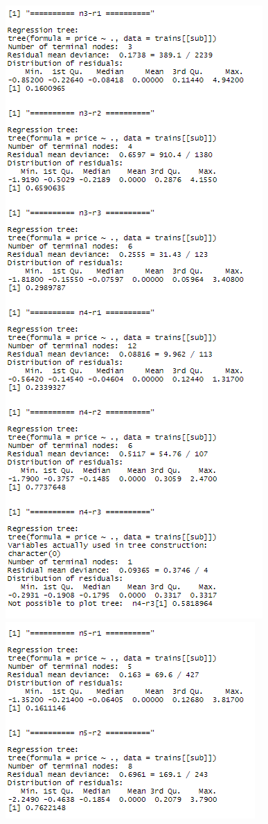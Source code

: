 \documentclass{FR16}
\begin{document}
\begin{figure}[!htb]
\begin{minipage}{0.48\textwidth}
   \end{minipage}\hfill
   \begin{minipage}{0.48\textwidth}
     \centering
     \includegraphics[width=.7\linewidth]{figures/dt3.PNG}
   \end{minipage}
   
    \begin{minipage}{0.48\textwidth}
     \centering
     \includegraphics[width=.7\linewidth]{figures/dt4.1.PNG}
   \end{minipage}
   

\end{figure}
\end{document}
